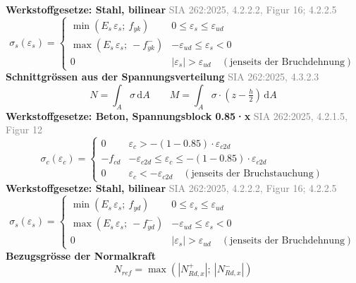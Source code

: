 \documentclass[11pt,a4paper]{article}
\newcommand{\normref}[1]{{\small\textcolor{gray}{#1}}}
\begin{document}
\noindent\textbf{Werkstoffgesetze: Stahl, bilinear} \hfill \normref{SIA 262:2025, 4.2.2.2, Figur 16; 4.2.2.5}
\begin{equation*}
\sigma_s(\varepsilon_s) = \begin{cases} \min(E_s\,\varepsilon_s;\ f_{yk}) & 0 \le \varepsilon_s \le \varepsilon_{ud} \\[1ex] \max(E_s\,\varepsilon_s;\ -f_{yk}^{-}) & -\varepsilon_{ud} \le \varepsilon_s < 0 \\[1ex] 0 & |\varepsilon_s| > \varepsilon_{ud} \quad (\text{jenseits der Bruchdehnung}) \end{cases}
\end{equation*}
\noindent\textbf{Schnittgrössen aus der Spannungsverteilung} \hfill \normref{SIA 262:2025, 4.3.2.3}
\begin{equation*}
N = \int_A \sigma\,\mathrm{d}A \qquad M = \int_A \sigma \cdot \left(z - \tfrac{h}{2}\right)\,\mathrm{d}A
\end{equation*}
\noindent\textbf{Werkstoffgesetze: Beton, Spannungsblock 0.85·x} \hfill \normref{SIA 262:2025, 4.2.1.5, Figur 12}
\begin{equation*}
\sigma_c(\varepsilon_c) = \begin{cases} 0 & \varepsilon_c > -(1 - 0.85) \cdot \varepsilon_{c2d} \\[1ex] -f_{cd} & -\varepsilon_{c2d} \le \varepsilon_c \le -(1 - 0.85) \cdot \varepsilon_{c2d} \\[1ex] 0 & \varepsilon_c < -\varepsilon_{c2d} \quad (\text{jenseits der Bruchstauchung}) \end{cases}
\end{equation*}
\noindent\textbf{Werkstoffgesetze: Stahl, bilinear} \hfill \normref{SIA 262:2025, 4.2.2.2, Figur 16; 4.2.2.5}
\begin{equation*}
\sigma_s(\varepsilon_s) = \begin{cases} \min(E_s\,\varepsilon_s;\ f_{yd}) & 0 \le \varepsilon_s \le \varepsilon_{ud} \\[1ex] \max(E_s\,\varepsilon_s;\ -f_{yd}^{-}) & -\varepsilon_{ud} \le \varepsilon_s < 0 \\[1ex] 0 & |\varepsilon_s| > \varepsilon_{ud} \quad (\text{jenseits der Bruchdehnung}) \end{cases}
\end{equation*}
\noindent\textbf{Bezugsgrösse der Normalkraft}
\begin{equation*}
N_{ref} = \max\left(\left|N_{Rd,x}^{+}\right|;\ \left|N_{Rd,x}^{-}\right|\right)
\end{equation*}
\end{document}

